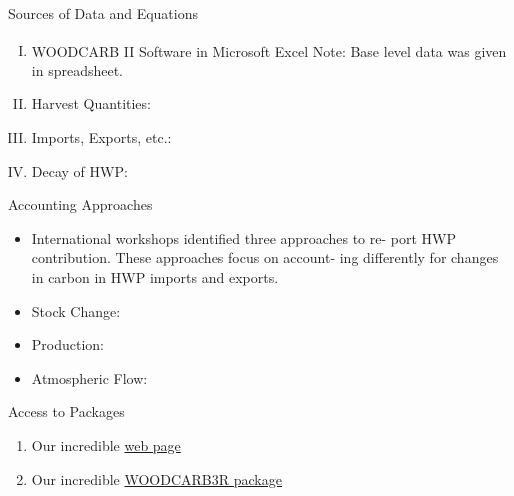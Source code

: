\documentclass[final]{beamer}\usepackage[]{graphicx}\usepackage[]{color}
\newlength{\onecolwid}
\begin{document}
\begin{frame}[t]
\begin{columns}[t]
\begin{column}{\onecolwid}

\begin{block}{Sources of Data and Equations}

\begin{enumerate}[I.]
\item WOODCARB II Software in Microsoft Excel\textsuperscript{\textregistered}
\vspace{0ex}
Note: Base level data was given in spreadsheet. 
\item Harvest Quantities:
\item Imports, Exports, etc.:
\item Decay of HWP:
\end{enumerate}
\vspace{0ex}

\end{block}
\vfill


\begin{block}{Accounting Approaches}

\begin{itemize}
\item International workshops identified three approaches to re- port HWP contribution. These approaches focus on account- ing differently for changes in carbon in HWP imports and exports.
\item Stock Change:
\item Production:
\item Atmospheric Flow:
\end{itemize}


\end{block}
\vfill


\begin{block}{Access to Packages}

\begin{enumerate}
\item Our incredible \href{http://madeitup.com}{web page}
\item Our incredible \href{http://benjones2.github.io/WOODCARB3R/}{WOODCARB3R package}
\end{enumerate}


\end{block}
\vfill


\end{column} %


\end{columns}
\end{frame}
\end{document}
